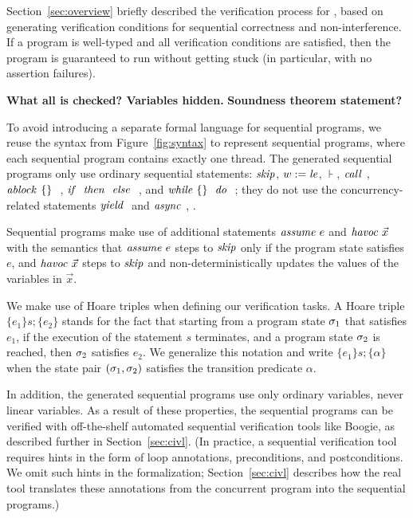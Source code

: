 

Section~\ref{sec:overview} briefly described the verification process for \civl, based on generating verification conditions for sequential correctness and non-interference.
If a program is well-typed and all verification conditions are satisfied, then the program is guaranteed to run without getting stuck (in particular, with no assertion failures). 

{\bf What all is checked? Variables hidden. }
{\bf Soundness theorem statement?}

To avoid introducing a separate formal language for sequential programs, we reuse the syntax from Figure~\ref{fig:syntax} to represent sequential programs, where each sequential program contains exactly one thread.
The generated sequential programs only use ordinary sequential statements:
$\mathit{skip}$, $w := \mathit{le}$, $\assert{}$, $\call{}$, $\mathit{ablock}^{}\ {\{\}}\ {}\ $, ${\mathit{if}\ {}\ }{\mathit{then}\ {}\ }{\mathit{else}\ {}\ }$, and $\mathit{while}\ \{{}\}\ {{}\ } \mathit{do}\ {{}\ }$;
they do not use the concurrency-related statements $\yield$ and $\mathit{async}\ $, .

Sequential programs make use of additional statements  $\mathit{assume}\ e$ and $\mathit{havoc}\ \vec{x}$ with the semantics that $\mathit{assume}\ e$ steps to $\mathit{skip}$ only if the program state satisfies $e$, and $\mathit{havoc}\ \vec{x}$ steps to $\mathit{skip}$ and non-deterministically updates the values of the variables in $\vec{x}$. 

We make use of Hoare triples when defining our verification tasks. A Hoare triple $\{e_1\} s; \{e_2\}$ stands for the fact that starting from a program state $\sigma_1$ that satisfies $e_1$, if the execution of the statement $s$ terminates, and a program state $\sigma_2$ is reached, then $\sigma_2$ satisfies $e_2$. We generalize this notation and write $\{e_1\} s; \{\alpha\}$ when the state pair $(\sigma_1,\sigma_2)$ satisfies the transition predicate $\alpha$. 

In addition, the generated sequential programs use only ordinary variables, never linear variables.
As a result of these properties, the sequential programs can be verified with off-the-shelf automated sequential verification tools like Boogie, as described further in Section~\ref{sec:civl}.
(In practice, a sequential verification tool requires hints in the form of loop annotations, preconditions, and postconditions.
We omit such hints in the formalization; Section~\ref{sec:civl} describes how the real \civl tool translates these annotations from the concurrent program into the sequential programs.)


